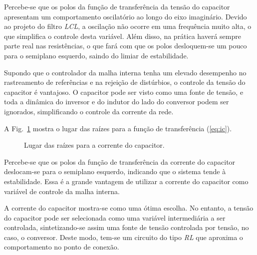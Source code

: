     Percebe-se que os polos da função de transferência da tensão do capacitor
    apresentam um comportamento oscilatório ao longo do eixo imaginário. Devido
    ao projeto do filtro \emph{LCL}, a oscilação não ocorre em uma frequência
    muito alta, o que simplifica o controle desta variável. Além disso, na prática
    haverá sempre parte real nas resistências, o que fará com que os polos desloquem-se
    um pouco para o semiplano esquerdo, saindo do limiar de estabilidade.

    Supondo que o controlador da malha interna tenha um elevado desempenho
    no rastreamento de referências e na rejeição de distúrbios,
    o controle da tensão do capacitor é vantajoso. O capacitor
    pode ser visto como uma fonte de tensão, e toda a dinâmica
    do inversor e do indutor do lado do conversor podem ser ignorados,
    simplificando o controle da corrente da rede.

    A Fig.~\ref{fig:rlocus_ic} mostra o lugar das raízes para a função de
    transferência (\ref{eq:ic}).

    \begin{figure}[htb]
        \renewcommand\figurename{Fig.}
        \caption{Lugar das raízes para a corrente do capacitor.}
        \label{fig:rlocus_ic}
    \end{figure}

    Percebe-se que os polos da função de transferência da corrente do capacitor
    deslocam-se para o semiplano esquerdo, indicando que o sistema tende à
    estabilidade. Essa é a grande vantagem de utilizar a corrente do capacitor
    como variável de controle da malha interna.

    A corrente do capacitor mostra-se como uma ótima escolha. No entanto, a tensão
    do capacitor pode ser selecionada como uma variável intermediária a ser controlada,
    sintetizando-se assim uma fonte de tensão controlada por tensão, no caso, o
    conversor. Deste modo, tem-se um circuito do tipo \emph{RL} que aproxima o
    comportamento no ponto de conexão.

